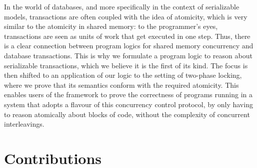 In the world of databases, and more specifically in the context of serializable models, transactions are often coupled with the idea of atomicity, which is very similar to the atomicity in shared memory: to the programmer's eyes, transactions are seen as units of work that get executed in one step. Thus, there is a clear connection between program logics for shared memory concurrency and database transactions. This is why we formulate a program logic to reason about serializable transactions, which we believe it is the first of its kind. The focus is then shifted to an application of our logic to the setting of two-phase locking, where we prove that its semantics conform with the required atomicity. This enables users of the framework to prove the correctness of  programs running in a system that adopts a flavour of this concurrency control protocol, by only having to reason atomically about blocks of code, without the complexity of concurrent interleavings.

\section{Contributions}

